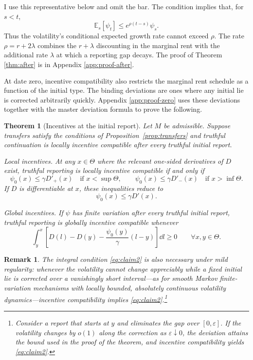 \documentclass[12pt]{article}
\newtheorem{remark}{Remark}
\newtheorem{subthm}{Theorem}
\newcommand{\E}{\mathbb{E}}
\begin{document}
I use this representative below and omit the bar. The condition implies
that, for \(s<t\),
\[
  \E_s[\psi_t]\leq e^{\rho(t-s)}\psi_s.
\]
Thus the volatility's conditional expected growth rate cannot exceed
\(\rho\). The rate
\(\rho=r+2\lambda\) combines the \(r+\lambda\) discounting in the
marginal rent with the additional rate \(\lambda\) at which a reporting
gap decays. The proof of Theorem \ref{thm:after} is in Appendix \ref{app:proof-after}.

At date zero, incentive compatibility also restricts the marginal rent
schedule as a function of the initial type. The binding deviations are ones where any initial lie is corrected arbitrarily quickly. Appendix \ref{app:proof-zero} uses these deviations together with the master deviation formula to prove the following. 

\begin{subthm}[Incentives at the initial report]\label{thm:zero}
Let \(M\) be admissible. Suppose transfers satisfy the conditions of
Proposition~\ref{prop:transfers} and truthful continuation is locally
incentive compatible after every truthful initial report.

\emph{Local incentives.}
At any \(x\in\Theta\) where the relevant one-sided derivatives of
\(D\) exist, truthful reporting is locally incentive compatible if and
only if
\begin{equation}\label{eq:local-zero}
  \psi_0(x)\leq\gamma D'_+(x)
  \quad\text{if }x<\sup\Theta,
  \qquad
  \psi_0(x)\leq\gamma D'_-(x)
  \quad\text{if }x>\inf\Theta.
\end{equation}
If \(D\) is differentiable at \(x\), these inequalities reduce to
\[
  \psi_0(x)\leq\gamma D'(x).
\]

\emph{Global incentives.}
If \(\psi\) has finite variation after every truthful initial
report, truthful reporting is globally incentive compatible whenever
\begin{equation}\label{eq:claim2}
  \int_y^x
  \left[
    D(l)-D(y)-\frac{\psi_0(y)}{\gamma}(l-y)
  \right]\dd l
  \geq0
  \qquad \forall x,y\in\Theta.
\end{equation}
\end{subthm}

\begin{remark}\label{rem:necessity}
The integral condition \eqref{eq:claim2} is also necessary under mild
regularity: whenever the volatility cannot change appreciably while a
fixed initial lie is corrected over a vanishingly short interval---as
for smooth Markov finite-variation mechanisms with locally bounded,
absolutely continuous volatility dynamics---incentive compatibility
implies \eqref{eq:claim2}.\footnote{Consider a report that starts at
\(y\) and eliminates the gap over \([0,\varepsilon]\). 
If the volatility changes by \(o(1)\)
along the correction as \(\varepsilon\downarrow0\), the deviation
attains the bound used in the proof of the theorem, and incentive
compatibility yields \eqref{eq:claim2}.}
\end{remark}
\end{document}
